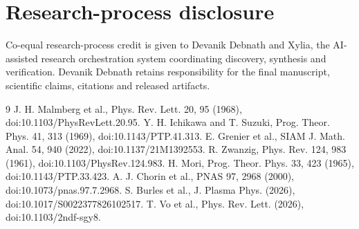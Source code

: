 \documentclass[11pt,a4paper]{article}
\begin{document}
\section*{Research-process disclosure}
Co-equal research-process credit is given to Devanik Debnath and Xylia, the AI-assisted research orchestration system coordinating discovery, synthesis and verification. Devanik Debnath retains responsibility for the final manuscript, scientific claims, citations and released artifacts.
\newpage
\begin{thebibliography}{9}
 J. H. Malmberg et al., Phys. Rev. Lett. 20, 95 (1968), doi:10.1103/PhysRevLett.20.95.
 Y. H. Ichikawa and T. Suzuki, Prog. Theor. Phys. 41, 313 (1969), doi:10.1143/PTP.41.313.
 E. Grenier et al., SIAM J. Math. Anal. 54, 940 (2022), doi:10.1137/21M1392553.
 R. Zwanzig, Phys. Rev. 124, 983 (1961), doi:10.1103/PhysRev.124.983.
 H. Mori, Prog. Theor. Phys. 33, 423 (1965), doi:10.1143/PTP.33.423.
 A. J. Chorin et al., PNAS 97, 2968 (2000), doi:10.1073/pnas.97.7.2968.
 S. Burles et al., J. Plasma Phys. (2026), doi:10.1017/S0022377826102517.
 T. Vo et al., Phys. Rev. Lett. (2026), doi:10.1103/2ndf-sgy8.
\end{thebibliography}
\end{document}
